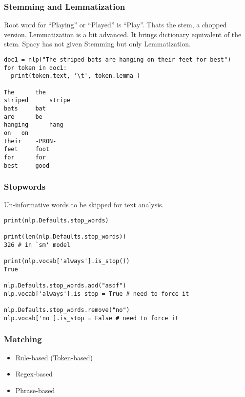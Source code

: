 \begin{frame}[fragile]\frametitle{ Stemming and Lemmatization}

Root word for ``Playing'' or ``Played'' is ``Play''. Thats the stem, a chopped version. Lemmatization is a bit advanced. It brings dictionary equivalent of the stem. Spacy has not given Stemming but only Lemmatization.


\begin{lstlisting}
doc1 = nlp("The striped bats are hanging on their feet for best")
for token in doc1:
  print(token.text, '\t', token.lemma_)
	
The 	 the
striped 	 stripe
bats 	 bat
are 	 be
hanging 	 hang
on 	 on
their 	 -PRON-
feet 	 foot
for 	 for
best 	 good
\end{lstlisting}


\end{frame}

\begin{frame}[fragile]\frametitle{Stopwords}
Un-informative words to be skipped for text analysis.

\begin{lstlisting}
print(nlp.Defaults.stop_words)

print(len(nlp.Defaults.stop_words))
326 # in `sm' model

print(nlp.vocab['always'].is_stop())
True

nlp.Defaults.stop_words.add("asdf")
nlp.vocab['always'].is_stop = True # need to force it

nlp.Defaults.stop_words.remove("no")
nlp.vocab['no'].is_stop = False # need to force it

\end{lstlisting}

\end{frame}

\begin{frame}[fragile]\frametitle{Matching }

  \begin{itemize}
    \item Rule-based (Token-based)
		\item Regex-based
		\item Phrase-based
  \end{itemize}
	

\end{frame}




